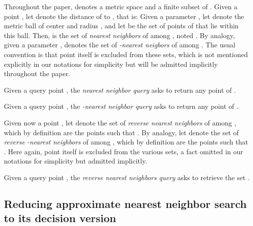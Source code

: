 Throughout the paper,  denotes a metric space and  a
finite subset of .  Given a point , let  denote
the distance of  to , that is:  Given a
parameter , let  denote the metric ball of
center  and radius , and let  be the set of
points of  that lie within this ball.  Then,
 is the set of {\em nearest neighbors} of
 among , noted . By analogy, given a
parameter ,  denotes the set
 of {\em -nearest neigbors} of 
among . The usual convention is that point  itself
is excluded from these sets, which is not mentioned explicitly in our
notations for simplicity but will be admitted implicitly throughout the paper.
\begin{problem}[\nn] \label{problem:nn}
  Given a query point , the {\em nearest neighbor query} asks
  to return any point of .
\end{problem}
\begin{problem}[-\nn] \label{problem:enn}
  Given a query point , the {\em -nearest neighbor query}
  asks to return any point of .
\end{problem}
Given now a point , let  denote the set of {\em
  reverse nearest neighbors} of  among , which by
definition are the points  such that . By analogy, let  denote the set of
     {\em reverse -nearest neighbors} of  among
     , which by definition are the points  such that . Here
     again, point  itself is excluded from the various sets, a fact
     omitted in our notations for simplicity but admitted
     implicitly.
\begin{problem}[\rnn] \label{problem:rnn}
  Given a query point , the {\em reverse nearest neighbors
    query} asks to retrieve the set .
\end{problem}



\subsection{Reducing approximate nearest neighbor search to its decision version}
\label{sec:renn-to-enn}

